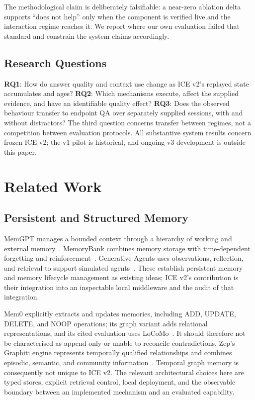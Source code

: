 \documentclass[twoside,11pt]{article}
\begin{document}
The methodological claim is deliberately falsifiable: a near-zero ablation delta supports ``does not help'' only when the component is verified live and the interaction regime reaches it. We report where our own evaluation failed that standard and constrain the system claims accordingly.

\subsection{Research Questions}
\textbf{RQ1}: How do answer quality and context use change as ICE v2's replayed state accumulates and ages?
\textbf{RQ2}: Which mechanisms execute, affect the supplied evidence, and have an identifiable quality effect?
\textbf{RQ3}: Does the observed behaviour transfer to endpoint QA over separately supplied sessions, with and without distractors?
The third question concerns transfer between regimes, not a competition between evaluation protocols. All substantive system results concern frozen ICE v2; the v1 pilot is historical, and ongoing v3 development is outside this paper.

\section{Related Work}
\label{sec:related-work}
\subsection{Persistent and Structured Memory}
\label{sec:related-memory}
MemGPT manages a bounded context through a hierarchy of working and external memory~\citep{packer2023memgpt}. MemoryBank combines memory storage with time-dependent forgetting and reinforcement~\citep{zhong2024memorybank}. Generative Agents uses observations, reflection, and retrieval to support simulated agents~\citep{park2023generative}. These establish persistent memory and memory lifecycle management as existing ideas; ICE v2's contribution is their integration into an inspectable local middleware and the audit of that integration.

Mem0 explicitly extracts and updates memories, including ADD, UPDATE, DELETE, and NOOP operations; its graph variant adds relational representations, and its cited evaluation uses LoCoMo~\citep{chhikara2025mem0}. It should therefore not be characterised as append-only or unable to reconcile contradictions. Zep's Graphiti engine represents temporally qualified relationships and combines episodic, semantic, and community information~\citep{rasmussen2025zep}. Temporal graph memory is consequently not unique to ICE v2. The relevant architectural choices here are typed stores, explicit retrieval control, local deployment, and the observable boundary between an implemented mechanism and an evaluated capability.
\end{document}

